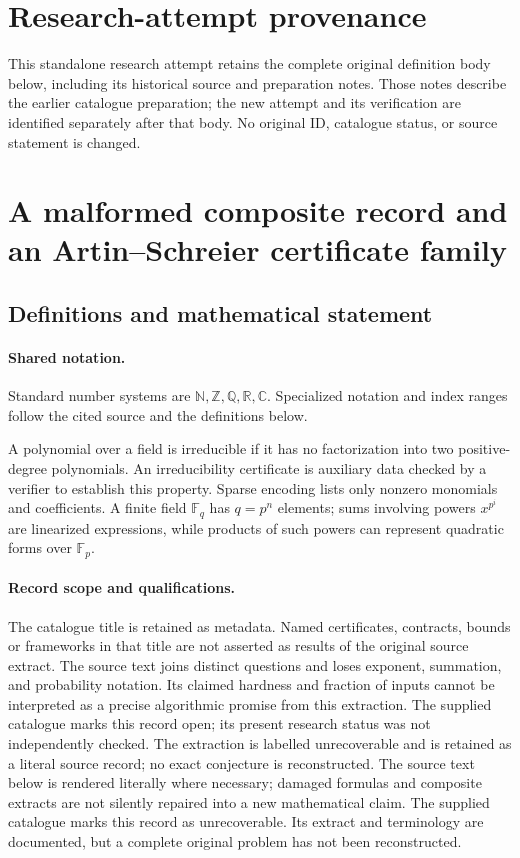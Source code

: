 \documentclass[11pt]{article}
\begin{document}
\section*{Research-attempt provenance}
This standalone research attempt retains the complete original definition body below,
including its historical source and preparation notes. Those notes describe the
earlier catalogue preparation; the new attempt and its verification are identified
separately after that body. No original ID, catalogue status, or source statement is changed.

\section{A malformed composite record and an Artin--Schreier certificate family}\label{statement}

\subsection{Definitions and mathematical statement}

\paragraph{Shared notation.}Standard number systems are $\mathbb N,\mathbb Z,\mathbb Q,\mathbb R,\mathbb C$. Specialized notation and index ranges follow the cited source and the definitions below.


A polynomial over a field is irreducible if it has no factorization into two positive-degree polynomials. An irreducibility certificate is auxiliary data checked by a verifier to establish this property. Sparse encoding lists only nonzero monomials and coefficients. A finite field $\mathbb F_q$ has $q=p^n$ elements; sums involving powers $x^{p^i}$ are linearized expressions, while products of such powers can represent quadratic forms over $\mathbb F_p$.
\paragraph{Record scope and qualifications.}
The catalogue title is retained as metadata. Named certificates, contracts, bounds or frameworks in that title are not asserted as results of the original source extract.
The source text joins distinct questions and loses exponent, summation, and probability notation. Its claimed hardness and fraction of inputs cannot be interpreted as a precise algorithmic promise from this extraction. The supplied catalogue marks this record open; its present research status was not independently checked. The extraction is labelled unrecoverable and is retained as a literal source record; no exact conjecture is reconstructed.
The source text below is rendered literally where necessary; damaged formulas and composite extracts are not silently repaired into a new mathematical claim.
The supplied catalogue marks this record as unrecoverable. Its extract and terminology are documented, but a complete original problem has not been reconstructed.
\end{document}
